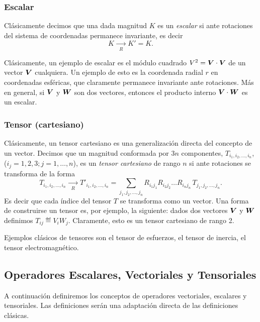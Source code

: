 \documentclass[10pt, a4paper]{article}
\numberwithin{equation}{subsection}
\begin{document}
\subsubsection{Escalar}
Clásicamente decimos que una dada magnitud $K$ es un \emph{escalar} si ante
rotaciones del sistema de coordenadas permanece invariante, es decir
\begin{equation}
  K \xrightarrow[R]{\qquad} K' = K.
\end{equation}

Clásicamente, un ejemplo de escalar es el módulo cuadrado $V^2 =
\vb*{V}\cdot\vb*{V}$ de un vector $\vb*{V}$ cualquiera. Un ejemplo de esto
es la coordenada radial $r$ en coordenadas esféricas, que claramente permanece
invariante ante rotaciones. Más en general, si $\vb*{V}$ y $\vb*{W}$ son dos
vectores, entonces el producto interno $\vb*{V}\cdot\vb*{W}$ es un escalar.

\subsubsection{Tensor (cartesiano)}
Clásicamente, un tensor cartesiano es una generalización directa del concepto
de un vector. Decimos que un magnitud conformada por $3n$ componentes,
$T_{i_1,i_2,\dots,i_n}$, ($i_j = 1,2,3; j = 1,\dots,n$), es un \emph{tensor
cartesiano} de rango $n$ si ante rotaciones se transforma de la forma
\begin{equation}
  T_{i_1,i_2,\dots,i_n} \xrightarrow[R]{\qquad}
    {T'}_{i_1,i_2,\dots,i_n} = \sum_{j_1,j_2,\dots,j_n}
    R_{i_1j_1}R_{i_2j_2}\dots R_{i_nj_n}\,T_{j_1,j_2,\dots,j_n}.
\end{equation}
Es decir que cada índice del tensor $T$ se transforma como un vector.  Una
forma de construirse un tensor es, por ejemplo, la siguiente: dados dos
vectores $\vb*{V}$ y $\vb*{W}$ definimos $T_{ij} \eqdef V_iW_j$. Claramente,
esto es un tensor cartesiano de rango 2.

Ejemplos clásicos de tensores son el tensor de esfuerzos, el tensor de inercia,
el tensor electromagnético.

\subsection{Operadores Escalares, Vectoriales y Tensoriales} A continuación
definiremos los conceptos de operadores vectoriales, escalares y tensoriales.
Las definiciones serán una adaptación directa de las definiciones clásicas.
\end{document}
